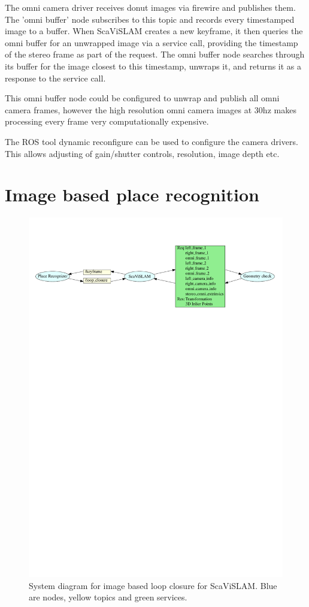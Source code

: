 The omni camera driver receives donut images via firewire and publishes them.  The 'omni buffer' node subscribes to this topic and records every timestamped image to a buffer.  When ScaViSLAM creates a new keyframe, it then queries the omni buffer for an unwrapped image via a service call, providing the timestamp of the stereo frame as part of the request.  The omni buffer node searches through its buffer for the image closest to this timestamp, unwraps it, and returns it as a response to the service call.

This omni buffer node could be configured to unwrap and publish all omni camera frames, however the high resolution omni camera images at 30hz makes processing every frame very computationally expensive.

The ROS tool dynamic reconfigure can be used to configure the camera drivers.  This allows adjusting of gain/shutter controls, resolution, image depth etc.

\section{Image based place recognition}

\begin{figure}[h]
  \centering
    \includegraphics[width=1.1\textwidth]{chapters/images/loop_close_architecture}
  \caption{System diagram for image based loop closure for ScaViSLAM.  Blue are nodes, yellow topics and green services.}
  \label{fig:loop_close_architecture}
\end{figure}

